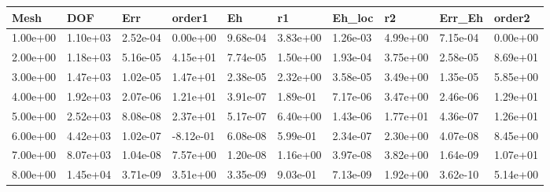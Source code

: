 \begin{tabular}{llllllllll}
Mesh & DOF & Err & order1 & Eh & r1 & Eh_loc & r2 & Err_Eh & order2 \\ 
\hline 
1.00e+00 & 1.10e+03 & 2.52e-04 &  0.00e+00 & 9.68e-04 & 3.83e+00 & 1.26e-03 & 4.99e+00 & 7.15e-04 & 0.00e+00 \\ 
2.00e+00 & 1.18e+03 & 5.16e-05 &  4.15e+01 & 7.74e-05 & 1.50e+00 & 1.93e-04 & 3.75e+00 & 2.58e-05 & 8.69e+01 \\ 
3.00e+00 & 1.47e+03 & 1.02e-05 &  1.47e+01 & 2.38e-05 & 2.32e+00 & 3.58e-05 & 3.49e+00 & 1.35e-05 & 5.85e+00 \\ 
4.00e+00 & 1.92e+03 & 2.07e-06 &  1.21e+01 & 3.91e-07 & 1.89e-01 & 7.17e-06 & 3.47e+00 & 2.46e-06 & 1.29e+01 \\ 
5.00e+00 & 2.52e+03 & 8.08e-08 &  2.37e+01 & 5.17e-07 & 6.40e+00 & 1.43e-06 & 1.77e+01 & 4.36e-07 & 1.26e+01 \\ 
6.00e+00 & 4.42e+03 & 1.02e-07 & -8.12e-01 & 6.08e-08 & 5.99e-01 & 2.34e-07 & 2.30e+00 & 4.07e-08 & 8.45e+00 \\ 
7.00e+00 & 8.07e+03 & 1.04e-08 &  7.57e+00 & 1.20e-08 & 1.16e+00 & 3.97e-08 & 3.82e+00 & 1.64e-09 & 1.07e+01 \\ 
8.00e+00 & 1.45e+04 & 3.71e-09 &  3.51e+00 & 3.35e-09 & 9.03e-01 & 7.13e-09 & 1.92e+00 & 3.62e-10 & 5.14e+00 \\ 
\hline 
\end{tabular}